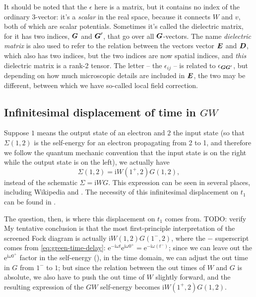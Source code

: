 \documentclass[hyperref, a4paper, 12pt]{report}
\newcommand*{\ii}{\mathrm{i}}
\newcommand*{\ee}{\mathrm{e}}
\begin{document}
It should be noted that the $\epsilon$ here is a matrix,
but it contains no index of the ordinary 3-vector:
it's a \emph{scalar} in the real space,
because it connects $W$ and $v$,
both of which are scalar potentials.
Sometimes it's called the dielectric matrix, 
for it has two indices, $\vb*{G}$ and $\vb*{G}'$,
that go over all $\vb*{G}$-vectors.
The name \emph{dielectric matrix}
is also used to refer to the relation between
the vectors vector $\vb*{E}$ and $\vb*{D}$,
which also has two indices, 
but the two indices are now spatial indices, 
and \emph{this} dielectric matrix is a rank-2 tensor.
The letter -- the $\epsilon_{ij}$ -- 
is related to $\epsilon_{\vb*{G} \vb*{G}'}$,
but depending on how much microscopic details are included in $\vb*{E}$,
the two may be different, 
between which we have so-called local field correction.

\subsection{Infinitesimal displacement of time in $GW$}\label{sec:gw-bse.overview-gw.infinitesimal}

Suppose $1$ means the output state of an electron 
and $2$ the input state
(so that $\Sigma(1, 2)$ is the self-energy for an electron propagating from 2 to 1,
and therefore we follow the quantum mechanic convention that 
the input state is on the right while the output state is on the left), 
we actually have 
\begin{equation}
    \Sigma(1, 2) = \ii W(1^+, 2) G(1, 2),
\end{equation}
instead of the schematic $\Sigma = \ii W G$.
This expression can be seen in several places,
including Wikipedia and \cite{hedin1965new,berger2020potential}.
The necessity of this infinitesimal displacement on $t_1$
can be found in .

The question, then, is where this displacement on $t_1$ comes from. TODO: verify 
My tentative conclusion is that the most first-principle interpretation of the screened Fock diagram 
is actually $\ii W(1, 2) G(1^-, 2)$, 
where the $-$ superscript comes from \eqref{eq:green-time-delay}:
$\ee^{- \ii \omega t} \ee^{\ii \omega 0^+} = \ee^{- \ii \omega (t^-)}$;
since we can leave out the $\ee^{\ii \omega 0^+}$ factor in the self-energy 
(),
in the time domain,
we can adjust the out time in $G$ from $1^-$ to $1$;
but since the relation between the out times of $W$ and $G$ is absolute, 
we also have to push the out time of $W$ slightly forward, 
and the resulting expression of the $GW$ self-energy becomes 
$\ii W(1^+, 2) G(1, 2)$.
\end{document}
